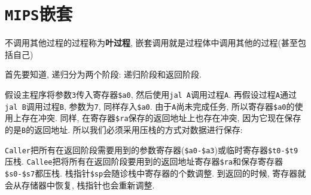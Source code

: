 \section{\texttt{MIPS}嵌套}
不调用其他过程的过程称为\textbf{叶过程}, 嵌套调用就是过程体中调用其他的过程(甚至包括自己) \par
首先要知道, 递归分为两个阶段: 递归阶段和返回阶段. \par
假设主程序将参数\verb|3|传入寄存器\verb|$a0|, 然后使用\verb|jal A|调用过程\verb|A|. 再假设过程\verb|A|通过\verb|jal B|调用过程\verb|B|, 参数为\verb|7|, 同样存入\verb|$a0|. 由于\verb|A|尚未完成任务, 所以寄存器\verb|$a0|的使用上存在冲突. 同样, 在寄存器\verb|$ra|保存的返回地址上也存在冲突, 因为它现在保存的是\verb|B|的返回地址. 所以我们必须采用压栈的方式对数据进行保存: \par
\texttt{Caller}把所有在返回阶段需要用到的参数寄存器(\verb|$a0-$a3|)或临时寄存器\verb|$t0-$t9|压栈. \verb|Callee|把将所有在返回阶段要用到的返回地址寄存器\verb|$ra|和保存寄存器\verb|$s0-$s7|都压栈. 栈指针\verb|$sp|会随诊栈中寄存器的个数调整. 到返回的时候, 寄存器就会从存储器中恢复, 栈指针也会重新调整.
